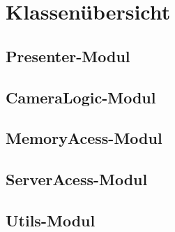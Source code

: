 \section{Klassenübersicht}

\subsection{Presenter-Modul}


\subsection{CameraLogic-Modul}

\subsection{MemoryAcess-Modul}

\subsection{ServerAcess-Modul}

\subsection{Utils-Modul}